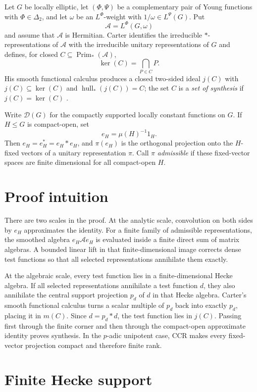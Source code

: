 \documentclass[11pt]{article}
\newcommand{\A}{\mathcal A}
\newcommand{\D}{\mathcal D}
\newcommand{\Prim}{\operatorname{Prim}}
\newcommand{\hull}{\operatorname{hull}}
\begin{document}
Let $G$ be locally elliptic, let $(\Phi,\Psi)$ be a complementary pair of
Young functions with $\Phi\in\Delta_2$, and let $\omega$ be an
$L^\Phi$-weight with $1/\omega\in L^\Psi(G)$.  Put
\[
  \A=L^\Phi(G,\omega)
\]
and assume that $\A$ is Hermitian.  Carter identifies the irreducible
$*$-representations of $\A$ with the irreducible unitary representations of
$G$ and defines, for closed $C\subseteq\Prim_*(\A)$,
\[
 \ker(C)=\bigcap_{P\in C}P.
\]
His smooth functional calculus produces a closed two-sided ideal $j(C)$ with
$j(C)\subseteq\ker(C)$ and $\hull_*(j(C))=C$; the set $C$ is a
\emph{set of synthesis} if $j(C)=\ker(C)$ \cite[Theorem 7.1]{Carter}.

Write $\D(G)$ for the compactly supported locally constant functions on $G$.
If $H\leq G$ is compact-open, set
\[
 e_H=\mu(H)^{-1}1_H.
\]
Then $e_H=e_H^*=e_H*e_H$, and $\pi(e_H)$ is the orthogonal projection onto
the $H$-fixed vectors of a unitary representation $\pi$.  Call $\pi$
\emph{admissible} if these fixed-vector spaces are finite dimensional for
all compact-open $H$.

\section{Proof intuition}

There are two scales in the proof.  At the analytic scale, convolution on
both sides by $e_H$ approximates the identity.  For a finite family of
admissible representations, the smoothed algebra $e_H\A e_H$ is evaluated
inside a finite direct sum of matrix algebras.  A bounded linear lift in that
finite-dimensional image corrects dense test functions so that all selected
representations annihilate them exactly.

At the algebraic scale, every test function lies in a finite-dimensional
Hecke algebra.  If all selected representations annihilate a test function
$d$, they also annihilate the central support projection $p_d$ of $d$ in
that Hecke algebra.  Carter's smooth functional calculus turns a scalar
multiple of $p_d$ back into exactly $p_d$, placing it in $m(C)$.  Since
$d=p_d*d$, the test function lies in $j(C)$.  Passing first through the
finite corner and then through the compact-open approximate identity proves
synthesis.  In the $p$-adic unipotent case, CCR makes every fixed-vector
projection compact and therefore finite rank.

\section{Finite Hecke support}
\end{document}
